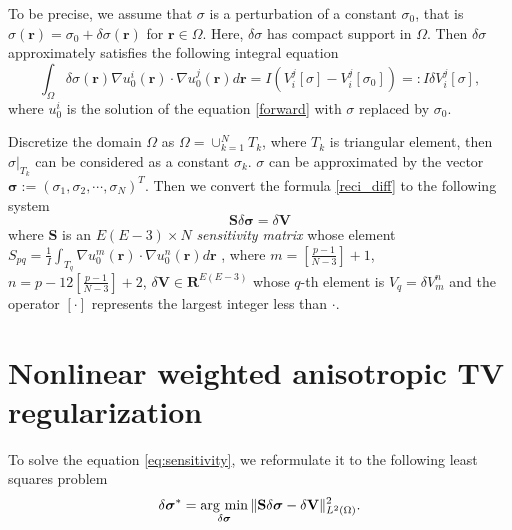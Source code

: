 \documentclass[lettersize,journal]{IEEEtran}
\def\r{\mathbf{r}}
\def\Om{\Omega}
\def\na{\nabla}
\begin{document}
To be precise, we assume that $\sigma$ is a perturbation of a constant $\sigma_0$, that is $\sigma(\r) = \sigma_0 + \delta \sigma(\r)$ for $\r\in \Omega$. Here, $\delta\sigma$ has compact support in $\Omega$. Then $\delta\sigma$ approximately satisfies the following integral equation
\begin{equation}\label{reci_diff}
  \int_\Omega \delta\sigma(\r)\nabla u^i_0(\r)\cdot \nabla u^j_0(\r)d\r = I(V_i^j[\sigma]-V_i^j[\sigma_0]) =:I\delta V_i^j[\sigma],
\end{equation}
where $u^i_0$ is the solution of the equation \eqref{forward} with $\sigma$ replaced by $\sigma_0$.

Discretize the domain $\Om$ as $\Omega = \cup_{k=1}^N T_k$, where $T_k$ is triangular element, then $\sigma|_{T_k}$ can be considered as a constant $\sigma_k$. $\sigma$ can be approximated by the vector $\bm{\sigma}:=(\sigma_1,\sigma_2,\cdots,\sigma_N)^T$. Then we convert the formula \eqref{reci_diff} to the following system
\begin{equation}\label{eq:sensitivity}
\mathbf{S}{\delta \bm \sigma} = \delta \mathbf{ V}
\end{equation}
where $\mathbf{S}$ is an $E(E-3)\times N$ \emph{sensitivity matrix} whose element $S_{pq} = \frac{1}{I} \int_{T_q} \na u_0^m(\r) \cdot \na u_0^n(\r)d\r$ , where $m = [\frac{p-1}{N-3}]+1$, $n = {p-12[\frac{p-1}{N-3}]+2}$,
$\delta \mathbf{V}\in \mathbf{R}^{E(E-3)}$ whose $q$-th element is $V_q = \delta V_m^n$
and the operator $[\cdot]$ represents the largest integer less than $\cdot$.

\section{Nonlinear weighted anisotropic TV regularization}

To solve the equation \eqref{eq:sensitivity}, we reformulate it to the following least squares problem
\begin{equation}\label{least-square}
  \delta\bm{\sigma}^* = \mathop{{\rm arg\ min}}\limits_{\delta\bm{\sigma}}\|\mathbf{S}\delta\bm{\sigma} - \delta\mathbf{V} \|^2_{L^2(\Omega)}.
\end{equation}
\end{document}

